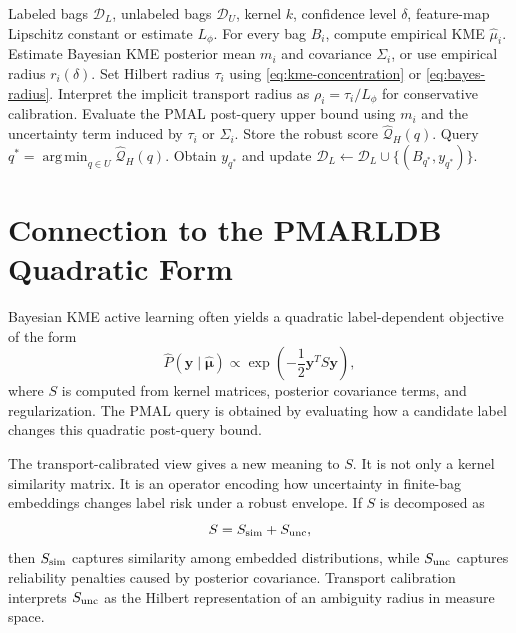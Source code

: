 \documentclass[10pt,journal]{IEEEtran}
\DeclareMathOperator*{\argmin}{arg\,min}
\newcommand{\Dcal}{\mathcal{D}}
\newcommand{\wh}{\widehat}
\begin{document}
\begin{algorithm}[t]
\caption{Transport-Calibrated Bayesian KME-PMAL}
\label{alg:tc-kme-pmal}
\begin{algorithmic}[1]
\REQUIRE Labeled bags $\Dcal_L$, unlabeled bags $\Dcal_U$, kernel $k$, confidence level $\delta$, feature-map Lipschitz constant or estimate $L_\phi$.
\STATE For every bag $B_i$, compute empirical KME $\wh\mu_i$.
\STATE Estimate Bayesian KME posterior mean $m_i$ and covariance $\Sigma_i$, or use empirical radius $r_i(\delta)$.
\STATE Set Hilbert radius $\tau_i$ using \eqref{eq:kme-concentration} or \eqref{eq:bayes-radius}.
\STATE Interpret the implicit transport radius as $\rho_i=\tau_i/L_\phi$ for conservative calibration.
    \STATE Evaluate the PMAL post-query upper bound using $m_i$ and the uncertainty term induced by $\tau_i$ or $\Sigma_i$.
    \STATE Store the robust score $\wh{\mathcal{Q}}_H(q)$.
\ENDFOR
\STATE Query $q^*=\argmin_{q\in U}\wh{\mathcal{Q}}_H(q)$.
\STATE Obtain $y_{q^*}$ and update $\Dcal_L\leftarrow \Dcal_L\cup\{(B_{q^*},y_{q^*})\}$.
\end{algorithmic}
\end{algorithm}

\section{Connection to the PMARLDB Quadratic Form}
\label{sec:quadratic}

Bayesian KME active learning often yields a quadratic label-dependent objective of the form
\begin{equation}
\label{eq:quadratic}
    \wh{P}(\mathbf{y}\mid\wh{\bm\mu})\propto \exp\left(-\frac{1}{2}\mathbf{y}^T S\mathbf{y}\right),
\end{equation}
where $S$ is computed from kernel matrices, posterior covariance terms, and regularization. The PMAL query is obtained by evaluating how a candidate label changes this quadratic post-query bound.

The transport-calibrated view gives a new meaning to $S$. It is not only a kernel similarity matrix. It is an operator encoding how uncertainty in finite-bag embeddings changes label risk under a robust envelope. If $S$ is decomposed as
\begin{equation}
    S=S_{\rm sim}+S_{\rm unc},
\end{equation}
then $S_{\rm sim}$ captures similarity among embedded distributions, while $S_{\rm unc}$ captures reliability penalties caused by posterior covariance. Transport calibration interprets $S_{\rm unc}$ as the Hilbert representation of an ambiguity radius in measure space.
\end{document}

